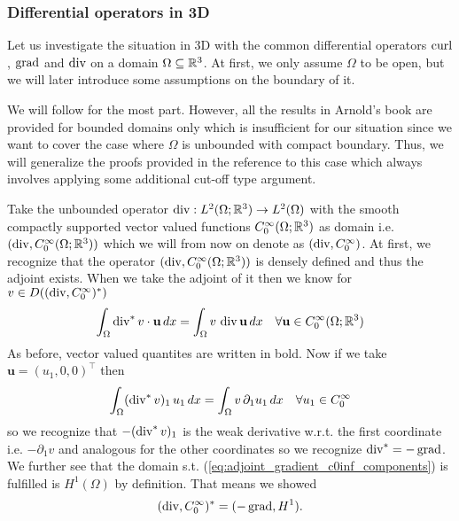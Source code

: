 \documentclass[../master_thesis.tex]{subfiles}
\begin{document}
\subsubsection{Differential operators in 3D}\label{sec:adjoints_differential_operators_3d}

Let us investigate the situation in 3D with the common differential 
operators $\operatorname{curl}$, $\operatorname{grad}$ and $\operatorname{div}$ on a domain $\Omega \subseteq \mathbb{R}^3$. 
At first, we only assume  $\Omega$ to be open, but we will later 
introduce some assumptions on the boundary of it. 


We will follow \cite[Sec.\,3.4]{arnold} for the most part. However, all the results in Arnold's book 
are provided for bounded domains only which is insufficient for our situation since 
we want to cover the case where $\Omega$ is unbounded with compact boundary. Thus, 
we will generalize the proofs provided in the reference to this case which always involves 
applying some additional cut-off type argument.

Take the unbounded operator 
$\operatorname{div}: L^2(\Omega;\mathbb{R}^3) \rightarrow L^2(\Omega)$ with the smooth compactly supported 
vector valued functions
$C_0^\infty(\Omega;\mathbb{R}^3)$ as domain i.e. $(\operatorname{div}, C_0^\infty(\Omega;\mathbb{R}^3))$ which 
we will from now on denote as $(\operatorname{div}, C_0^\infty)$. At first, we recognize that 
the operator $(\operatorname{div}, C_0^\infty(\Omega;\mathbb{R}^3))$ is densely defined and thus the adjoint exists.
When we take the adjoint of it then we know for $v \in 
D((\operatorname{div}, C_0^\infty)^*)$
\begin{align*}
    \int_\Omega \operatorname{div} ^* v \cdot \mathbf{u} \, dx
    = \int_\Omega v \, \operatorname{div} \mathbf{u} \, dx \quad \forall 
    \mathbf{u} \in C_0^\infty(\Omega;\mathbb{R}^3)
\end{align*}
As before, vector valued quantites are written in bold.
Now if we take $\mathbf{u} = (u_1,0,0)^\top$ then 
\begin{align}
    \int_\Omega (\operatorname{div} ^* v)_1 \, u_1 \, dx
    = \int_\Omega v \, \partial_1 u_1 \, dx \quad 
        \forall u_1 \in C_0^\infty \label{eq:adjoint_gradient_c0inf_components}
\end{align}
so we recognize that $-(\operatorname{div} ^* v)_1$ is the weak derivative w.r.t. the 
first coordinate i.e. $-\partial_1 v$ and analogous for the other coordinates 
so we recognize $\operatorname{div}^* = -\operatorname{grad}$. We further see that the
domain s.t. (\ref{eq:adjoint_gradient_c0inf_components}) is fulfilled is $H^1(\Omega)$ 
by definition. That means we showed 
\begin{align}
    (\operatorname{div}, C_0^\infty)^* = (-\operatorname{grad}, H^1). \label{eq:adjoint_gradient_c0inf} 
\end{align}
\end{document}
